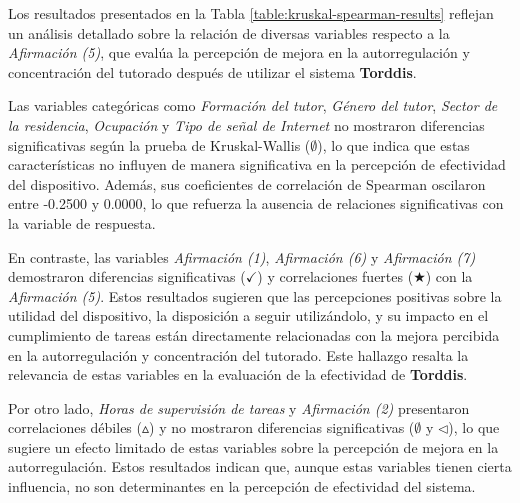 Los resultados presentados en la Tabla \ref{table:kruskal-spearman-results} reflejan un análisis detallado sobre la relación de diversas variables respecto a la \textit{Afirmación (5)}, que evalúa la percepción de mejora en la autorregulación y concentración del tutorado después de utilizar el sistema \textbf{Torddis}.

Las variables categóricas como \textit{Formación del tutor}, \textit{Género del tutor}, \textit{Sector de la residencia}, \textit{Ocupación} y \textit{Tipo de señal de Internet} no mostraron diferencias significativas según la prueba de Kruskal-Wallis (\(\emptyset\)), lo que indica que estas características no influyen de manera significativa en la percepción de efectividad del dispositivo. Además, sus coeficientes de correlación de Spearman oscilaron entre -0.2500 y 0.0000, lo que refuerza la ausencia de relaciones significativas con la variable de respuesta.

En contraste, las variables \textit{Afirmación (1)}, \textit{Afirmación (6)} y \textit{Afirmación (7)} demostraron diferencias significativas (\(\checkmark\)) y correlaciones fuertes (\(\bigstar\)) con la \textit{Afirmación (5)}. Estos resultados sugieren que las percepciones positivas sobre la utilidad del dispositivo, la disposición a seguir utilizándolo, y su impacto en el cumplimiento de tareas están directamente relacionadas con la mejora percibida en la autorregulación y concentración del tutorado. Este hallazgo resalta la relevancia de estas variables en la evaluación de la efectividad de \textbf{Torddis}.

Por otro lado, \textit{Horas de supervisión de tareas} y \textit{Afirmación (2)} presentaron correlaciones débiles (\(\vartriangle\)) y no mostraron diferencias significativas (\(\emptyset\) y \(\triangleleft\)), lo que sugiere un efecto limitado de estas variables sobre la percepción de mejora en la autorregulación. Estos resultados indican que, aunque estas variables tienen cierta influencia, no son determinantes en la percepción de efectividad del sistema.
